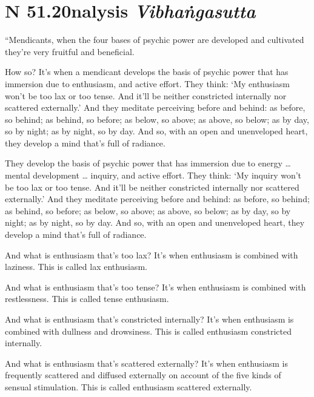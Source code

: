 \documentclass[12pt,openany]{book}%
\newcommand*{\suttatitleacronym}[1]{\smaller[2]{#1}\vspace*{.3em}}
\newcommand*{\suttatitletranslation}[1]{\linebreak{#1}}
\newcommand*{\suttatitleroot}[1]{\linebreak\smaller[2]\itshape{#1}}
\newcommand*{\tocacronym}[1]{\hspace*{-3.3em}{#1}\quad}
\newcommand*{\toctranslation}[1]{#1}
\newcommand*{\tocroot}[1]{(\textit{#1})}
\begin{document}
%
\section*{{\suttatitleacronym SN 51.20}{\suttatitletranslation Analysis }{\suttatitleroot Vibhaṅgasutta}}
\addcontentsline{toc}{section}{\tocacronym{SN 51.20} \toctranslation{Analysis } \tocroot{Vibhaṅgasutta}}

“Mendicants, when the four bases of psychic power are developed and cultivated they’re very fruitful and beneficial. 

How so? It’s when a mendicant develops the basis of psychic power that has immersion due to enthusiasm, and active effort. They think: ‘My enthusiasm won’t be too lax or too tense. And it’ll be neither constricted internally nor scattered externally.’ And they meditate perceiving before and behind: as before, so behind; as behind, so before; as below, so above; as above, so below; as by day, so by night; as by night, so by day. And so, with an open and unenveloped heart, they develop a mind that’s full of radiance. 

They develop the basis of psychic power that has immersion due to energy … mental development … inquiry, and active effort. They think: ‘My inquiry won’t be too lax or too tense. And it’ll be neither constricted internally nor scattered externally.’ And they meditate perceiving before and behind: as before, so behind; as behind, so before; as below, so above; as above, so below; as by day, so by night; as by night, so by day. And so, with an open and unenveloped heart, they develop a mind that’s full of radiance. 

And what is enthusiasm that’s too lax? It’s when enthusiasm is combined with laziness. This is called lax enthusiasm. 

And what is enthusiasm that’s too tense? It’s when enthusiasm is combined with restlessness. This is called tense enthusiasm. 

And what is enthusiasm that’s constricted internally? It’s when enthusiasm is combined with dullness and drowsiness. This is called enthusiasm constricted internally. 

And what is enthusiasm that’s scattered externally? It’s when enthusiasm is frequently scattered and diffused externally on account of the five kinds of sensual stimulation. This is called enthusiasm scattered externally. 
\end{document}
